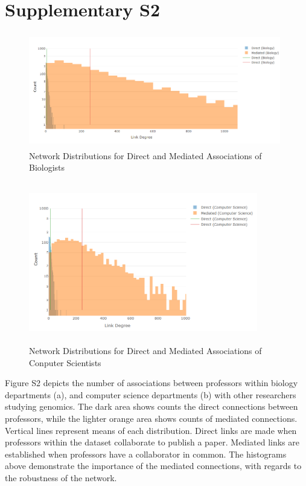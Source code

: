 \documentclass[10pt]{article}         %
\begin{document}
\section{Supplementary S2}
\begin{figure}[!htb]
  \centering
  \includegraphics[width=11cm, height=5cm]{FigS2A.PNG}
  \caption{Network Distributions for Direct and Mediated Associations of Biologists}
  \label{fig:S2A}
\end{figure}
\begin{figure}[!htb]
  \centering
  \includegraphics[width=10cm, height=7cm]{FigS2B.PNG}
  \caption{Network Distributions for Direct and Mediated Associations of Conputer Scientists}
  \label{fig:S2B}
\end{figure}
Figure S2 depicts the number of associations between professors within biology departments (a), and computer science departments (b) with other researchers studying genomics. The dark area shows counts the direct connections between professors, while the lighter orange area shows counts of mediated connections. Vertical lines represent means of each distribution. Direct links are made when professors within the dataset collaborate to publish a paper. Mediated links are established when professors have a collaborator in common. The histograms above demonstrate the importance of the mediated connections, with regards to the robustness of the network. 
\end{document}
